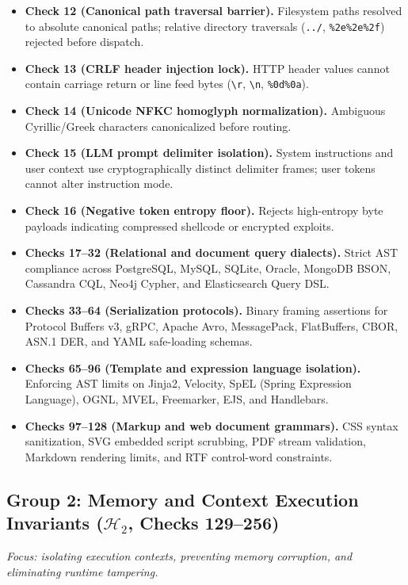 \documentclass{portalciencia}
\theoremstyle{plain}
\theoremstyle{definition}
\begin{document}
\begin{itemize}
  \item \textbf{Check 12 (Canonical path traversal barrier).} Filesystem paths resolved to absolute canonical paths; relative directory traversals (\texttt{../}, \texttt{\%2e\%2e\%2f}) rejected before dispatch.
  \item \textbf{Check 13 (CRLF header injection lock).} HTTP header values cannot contain carriage return or line feed bytes (\texttt{\textbackslash r}, \texttt{\textbackslash n}, \texttt{\%0d\%0a}).
  \item \textbf{Check 14 (Unicode NFKC homoglyph normalization).} Ambiguous Cyrillic/Greek characters canonicalized before routing.
  \item \textbf{Check 15 (LLM prompt delimiter isolation).} System instructions and user context use cryptographically distinct delimiter frames; user tokens cannot alter instruction mode.
  \item \textbf{Check 16 (Negative token entropy floor).} Rejects high-entropy byte payloads indicating compressed shellcode or encrypted exploits.
  \item \textbf{Checks 17--32 (Relational and document query dialects).} Strict AST compliance across PostgreSQL, MySQL, SQLite, Oracle, MongoDB BSON, Cassandra CQL, Neo4j Cypher, and Elasticsearch Query DSL.
  \item \textbf{Checks 33--64 (Serialization protocols).} Binary framing assertions for Protocol Buffers v3, gRPC, Apache Avro, MessagePack, FlatBuffers, CBOR, ASN.1 DER, and YAML safe-loading schemas.
  \item \textbf{Checks 65--96 (Template and expression language isolation).} Enforcing AST limits on Jinja2, Velocity, SpEL (Spring Expression Language), OGNL, MVEL, Freemarker, EJS, and Handlebars.
  \item \textbf{Checks 97--128 (Markup and web document grammars).} CSS syntax sanitization, SVG embedded script scrubbing, PDF stream validation, Markdown rendering limits, and RTF control-word constraints.
\end{itemize}

\subsection{Group 2: Memory and Context Execution Invariants ($\mathcal{H}_2$, Checks 129--256)}

\emph{Focus: isolating execution contexts, preventing memory corruption, and eliminating runtime tampering.}
\end{document}
